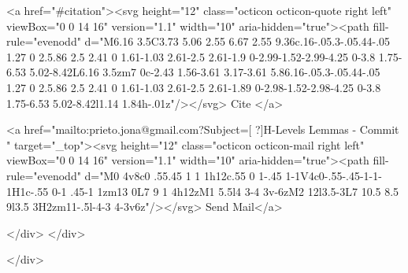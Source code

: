       <a  href="#citation"><svg height="12" class="octicon octicon-quote right left" viewBox="0 0 14 16" version="1.1" width="10" aria-hidden="true"><path fill-rule="evenodd" d="M6.16 3.5C3.73 5.06 2.55 6.67 2.55 9.36c.16-.05.3-.05.44-.05 1.27 0 2.5.86 2.5 2.41 0 1.61-1.03 2.61-2.5 2.61-1.9 0-2.99-1.52-2.99-4.25 0-3.8 1.75-6.53 5.02-8.42L6.16 3.5zm7 0c-2.43 1.56-3.61 3.17-3.61 5.86.16-.05.3-.05.44-.05 1.27 0 2.5.86 2.5 2.41 0 1.61-1.03 2.61-2.5 2.61-1.89 0-2.98-1.52-2.98-4.25 0-3.8 1.75-6.53 5.02-8.42l1.14 1.84h-.01z"/></svg> Cite
      </a>

      <a href="mailto:prieto.jona@gmail.com?Subject=[ ?]H-Levels Lemmas - Commit " target="_top"><svg height="12" class="octicon octicon-mail right left" viewBox="0 0 14 16" version="1.1" width="10" aria-hidden="true"><path fill-rule="evenodd" d="M0 4v8c0 .55.45 1 1 1h12c.55 0 1-.45 1-1V4c0-.55-.45-1-1-1H1c-.55 0-1 .45-1 1zm13 0L7 9 1 4h12zM1 5.5l4 3-4 3v-6zM2 12l3.5-3L7 10.5 8.5 9l3.5 3H2zm11-.5l-4-3 4-3v6z"/></svg> Send Mail</a>

    </div>
  </div>

</div>




